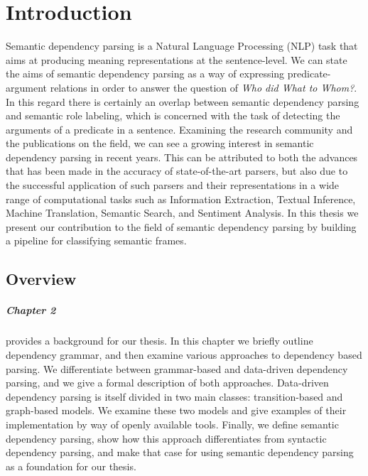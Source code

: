 \chapter{Introduction}
\label{chap:introduction}

Semantic dependency parsing is a Natural Language Processing (NLP) task that aims at producing meaning representations at the sentence-level. We can state the aims of semantic dependency parsing as a way of expressing predicate-argument  relations in order to answer the question of \textit{Who did What to Whom?}.  In this regard there is certainly an overlap between semantic dependency parsing  and semantic role labeling, which is concerned with the task of detecting the arguments of a predicate in a sentence. Examining the research community and the publications on the field, we can see a growing interest in semantic dependency parsing in recent years. This can be attributed to both the advances that has been made in the accuracy of state-of-the-art parsers, but also due to the successful application of such parsers and their representations in a wide range of computational tasks such as Information Extraction, Textual Inference, Machine Translation, Semantic Search, and Sentiment Analysis. In this thesis we present our contribution to the field of semantic dependency parsing by building a pipeline for classifying semantic frames.

\section{Overview} 

\paragraph{Chapter 2} provides a background for our thesis. In this chapter we briefly outline dependency grammar, and then examine various approaches to dependency based parsing. We differentiate between grammar-based and data-driven dependency parsing, and we give a formal description of both approaches. Data-driven dependency parsing is itself divided in two main classes: transition-based and graph-based models. We examine these two models and give examples of their implementation by way of openly available tools. Finally, we define semantic dependency parsing, show how this approach differentiates from syntactic dependency parsing, and make that case for using semantic dependency parsing as a foundation for our thesis.

